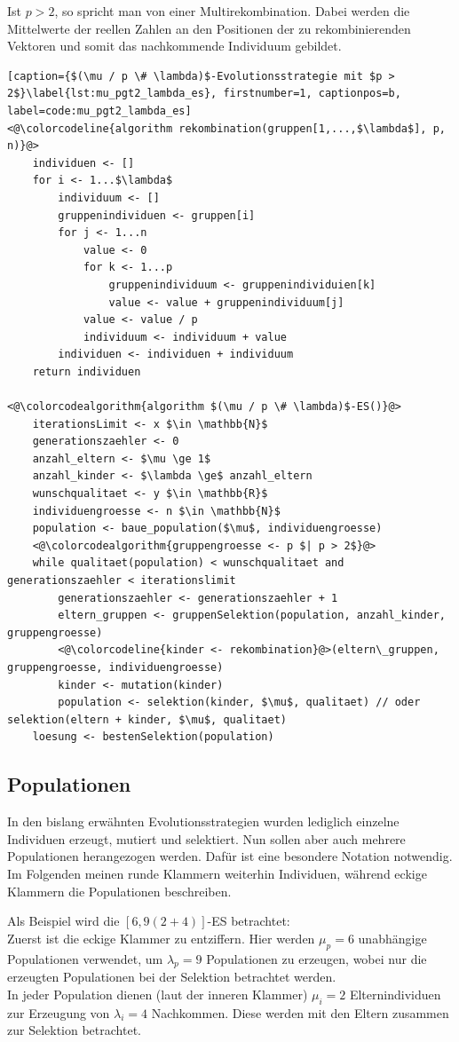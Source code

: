 Ist $p > 2$, so spricht man von einer Multirekombination.
Dabei werden die Mittelwerte der reellen Zahlen an den Positionen der zu rekombinierenden Vektoren und somit das nachkommende Individuum gebildet.

\begin{lstlisting}[caption={$(\mu / p \# \lambda)$-Evolutionsstrategie mit $p > 2$}\label{lst:mu_pgt2_lambda_es}, firstnumber=1, captionpos=b, label=code:mu_pgt2_lambda_es]
<@\colorcodeline{algorithm rekombination(gruppen[1,...,$\lambda$], p, n)}@>
	individuen <- []
	for i <- 1...$\lambda$
		individuum <- []
		gruppenindividuen <- gruppen[i]
		for j <- 1...n
			value <- 0
			for k <- 1...p
				gruppenindividuum <- gruppenindividuien[k]
				value <- value + gruppenindividuum[j]
			value <- value / p
			individuum <- individuum + value
		individuen <- individuen + individuum
	return individuen

<@\colorcodealgorithm{algorithm $(\mu / p \# \lambda)$-ES()}@>
	iterationsLimit <- x $\in \mathbb{N}$
	generationszaehler <- 0
	anzahl_eltern <- $\mu \ge 1$
	anzahl_kinder <- $\lambda \ge$ anzahl_eltern
	wunschqualitaet <- y $\in \mathbb{R}$
	individuengroesse <- n $\in \mathbb{N}$
	population <- baue_population($\mu$, individuengroesse)
	<@\colorcodealgorithm{gruppengroesse <- p $| p > 2$}@>
	while qualitaet(population) < wunschqualitaet and generationszaehler < iterationslimit
		generationszaehler <- generationszaehler + 1
		eltern_gruppen <- gruppenSelektion(population, anzahl_kinder, gruppengroesse)
		<@\colorcodeline{kinder <- rekombination}@>(eltern\_gruppen, gruppengroesse, individuengroesse)
		kinder <- mutation(kinder)
		population <- selektion(kinder, $\mu$, qualitaet) // oder selektion(eltern + kinder, $\mu$, qualitaet)
	loesung <- bestenSelektion(population)
\end{lstlisting}

\subsection{Populationen}

In den bislang erwähnten Evolutionsstrategien wurden lediglich einzelne Individuen erzeugt, mutiert und selektiert.
Nun sollen aber auch mehrere Populationen herangezogen werden.
Dafür ist eine besondere Notation notwendig.
Im Folgenden meinen runde Klammern weiterhin Individuen, während eckige Klammern die Populationen beschreiben.

Als Beispiel wird die $[6,9(2+4)]$-ES betrachtet:\\
Zuerst ist die eckige Klammer zu entziffern. Hier werden $\mu_p = 6$ unabhängige Populationen verwendet, um  $\lambda_p = 9$ Populationen zu erzeugen, wobei nur die erzeugten Populationen bei der Selektion betrachtet werden.\\
In jeder Population dienen (laut der inneren Klammer) $\mu_i = 2$ Elternindividuen zur Erzeugung von $\lambda_i = 4$ Nachkommen. Diese werden mit den Eltern zusammen zur Selektion betrachtet.

